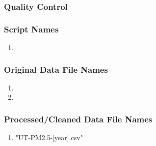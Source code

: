 \subsubsection*{Quality Control}

\subsubsection*{Script Names}

\begin{enumerate}
\item 
\end{enumerate}

\subsubsection*{Original Data File Names}

\begin{enumerate}
\item 
\item 
\end{enumerate}

\subsubsection*{Processed/Cleaned Data File Names}

\begin{enumerate}
\item "UT-PM2.5-[year].csv"
\end{enumerate}
